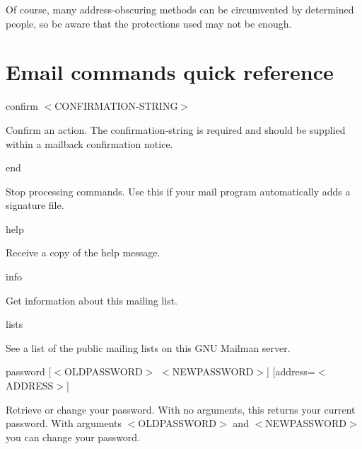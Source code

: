 \documentclass{howto}
\begin{document}
Of course, many address-obscuring methods can be circumvented by determined 
people, so be aware that the protections used may not be enough.

\appendix
\section{Email commands quick reference\label{a:commands}}
\begin{list}{}{}
	\item confirm $<$CONFIRMATION-STRING$>$
		\begin{list}{}{}
			\item
        Confirm an action.  The confirmation-string is required and should be
        supplied within a mailback confirmation notice.
		\end{list}

   \item end
		\begin{list}{}{}
			\item
        Stop processing commands.  Use this if your mail program automatically
        adds a signature file.
		\end{list}

   \item help
		\begin{list}{}{}
			\item
        Receive a copy of the help message.
		\end{list}

   \item info
		\begin{list}{}{}
			\item
        Get information about this mailing list.
		\end{list}

   \item lists
		\begin{list}{}{}
			\item
        See a list of the public mailing lists on this GNU Mailman server.
		\end{list}

    \item {password [$<$OLDPASSWORD$>$ $<$NEWPASSWORD$>$] [address=$<$ADDRESS$>$]}
		\begin{list}{}{}
			\item
        Retrieve or change your password.  With no arguments, this returns
        your current password.  With arguments $<$OLDPASSWORD$>$ and $<$NEWPASSWORD$>$
        you can change your password.
		\end{list}


\end{list}
\end{document}
